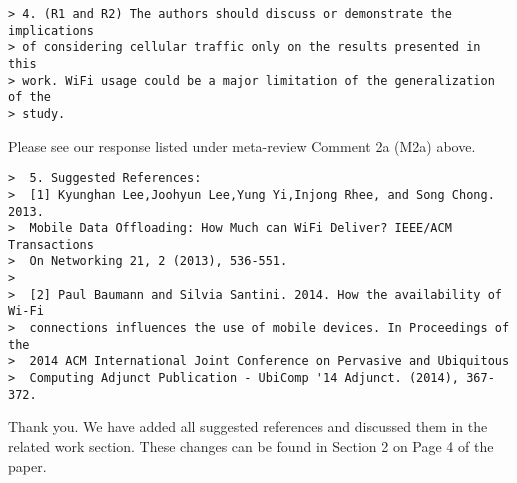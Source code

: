 \begin{verbatim}
> 4. (R1 and R2) The authors should discuss or demonstrate the implications
> of considering cellular traffic only on the results presented in this
> work. WiFi usage could be a major limitation of the generalization of the
> study.
\end{verbatim}

Please see our response 
listed under meta-review Comment 2a (M2a) above. 

\begin{verbatim}
>  5. Suggested References:
>  [1] Kyunghan Lee,Joohyun Lee,Yung Yi,Injong Rhee, and Song Chong. 2013.
>  Mobile Data Offloading: How Much can WiFi Deliver? IEEE/ACM Transactions
>  On Networking 21, 2 (2013), 536-551.
>
>  [2] Paul Baumann and Silvia Santini. 2014. How the availability of Wi-Fi
>  connections influences the use of mobile devices. In Proceedings of the
>  2014 ACM International Joint Conference on Pervasive and Ubiquitous
>  Computing Adjunct Publication - UbiComp '14 Adjunct. (2014), 367-372.
\end{verbatim}

Thank you. 
We have added all suggested references and discussed them in the related work section. 
These changes can be found in Section 2 on Page 4 of the paper.